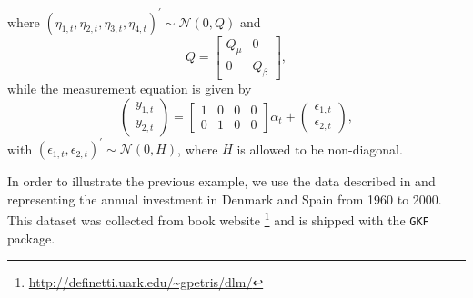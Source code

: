 \documentclass{article}
\newcommand{\GKF}{\texttt{GKF}\xspace}
\begin{document}
where $(\eta_{1,t},\eta_{2,t},\eta_{3,t},\eta_{4,t})^{\prime} \sim \mathcal{N}(0,Q)$ and
\begin{equation*}
  Q = \left[\begin{array}{c|c}
              Q_{\mu} & 0 \\ \hline
              0 & Q_{\beta}
            \end{array}\right]
  ,
\end{equation*}
while the measurement equation is given by
\begin{equation}
  \begin{pmatrix}
    y_{1,t}\\
    y_{2,t}
  \end{pmatrix}
  =
  \begin{bmatrix}
    1 & 0 & 0 & 0 \\
    0 & 1 & 0 & 0
  \end{bmatrix}
  \alpha_t +
  \begin{pmatrix}
    \epsilon_{1,t}\\
    \epsilon_{2,t}
  \end{pmatrix}
  ,
  \label{eq:LinearGrowthObs}
\end{equation}
with $(\epsilon_{1,t},\epsilon_{2,t})^\prime  \sim \mathcal{N}(0,H)$, where $H$ is allowed to be non-diagonal.

In order to illustrate the previous example, we use the data described in
\citet[chap. 3.3.2]{petris2009dynamic} and representing the annual investment in Denmark and
Spain from 1960 to 2000. This dataset was collected from \citet{petris2009dynamic} book
website \footnote{\url{http://definetti.uark.edu/~gpetris/dlm/}} and is shipped with the \GKF
package.
\end{document}
